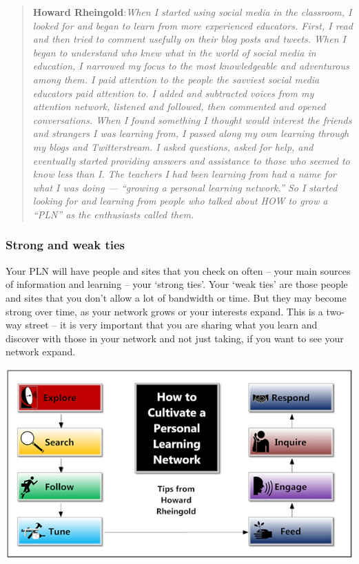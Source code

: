 \begin{quote}
\textbf{Howard Rheingold}:\emph{When I started using social media in the
classroom, I looked for and began to learn from more experienced
educators. First, I read and then tried to comment usefully on their
blog posts and tweets. When I began to understand who knew what in the
world of social media in education, I narrowed my focus to the most
knowledgeable and adventurous among them. I paid attention to the people
the savviest social media educators paid attention to. I added and
subtracted voices from my attention network, listened and followed, then
commented and opened conversations. When I found something I thought
would interest the friends and strangers I was learning from, I passed
along my own learning through my blogs and Twitterstream. I asked
questions, asked for help, and eventually started providing answers and
assistance to those who seemed to know less than I. The teachers I had
been learning from had a name for what I was doing --- ``growing a
personal learning network.'' So I started looking for and learning from
people who talked about HOW to grow a ``PLN'' as the enthusiasts called
them.}
\end{quote}

\subsubsection{\textbf{Strong and weak ties}}

Your PLN will have people and sites that you check on often -- your main
sources of information and learning -- your `strong ties'. Your `weak
ties' are those people and sites that you don't allow a lot of bandwidth
or time. But they may become strong over time, as your network grows or
your interests expand. This is a two-way street -- it is very important
that you are sharing what you learn and discover with those in your
network and not just taking, if you want to see your network expand.

\begin{center}
\includegraphics[width=.7\textwidth]{../pictures/Personal-Learning-Network-900px-v2.jpeg}
\end{center}

